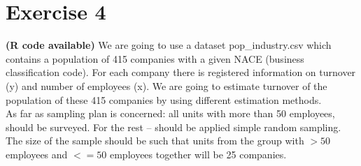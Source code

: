 \documentclass[12pt]{article}
\begin{document}
\section*{Exercise 4}
\textbf{\color{ForestGreen}(R code available)} We are going to use a dataset pop\_industry.csv which contains a population of 415 companies with a given NACE (business classification code). For each company there is registered information on turnover (y) and number of employees (x). We are going to estimate turnover of the population of these 415 companies by using different estimation methods.\\
As far as sampling plan is concerned: all units with more than 50 employees, should be surveyed. For the rest – should be applied simple random sampling. The size of the sample should be such that units from the group with $> 50$ employees and $<= 50$ employees together will be 25 companies. 
\end{document}
